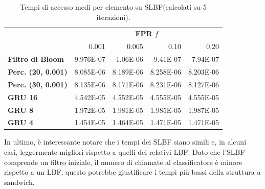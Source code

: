 \documentclass[../../main.tex]{subfiles}
\begin{document}
    \begin{table}[H]
        \centering
        \begin{tabular}{lrrrr}
            \toprule
            & \multicolumn{4}{c}{\textbf{FPR} $f$}\\
            & 0.001 & 0.005 & 0.10 & 0.20\\        
            \midrule
            \textbf{Filtro di Bloom} & 9.976E-07 & 1.06E-06 & 9.41E-07 & 7.94E-07\\
            \midrule
            \textbf{Perc. (20, 0.001)} & 8.085E-06 & 8.189E-06 &  8.258E-06 & 8.203E-06\\
            \textbf{Perc. (30, 0.001)} & 8.135E-06 & 8.171E-06 &  8.231E-06 & 8.127E-06\\
            \textbf{GRU 16} & 4.542E-05 & 4.552E-05 &  4.555E-05 & 4.555E-05\\
            \textbf{GRU 8} &  1.972E-05 & 1.981E-05 &  1.985E-05 & 1.987E-05\\
            \textbf{GRU 4} & 1.454E-05 & 1.464E-05 & 1.471E-05 & 1.471E-05\\
            \bottomrule
        \end{tabular}
        \caption{Tempi di accesso medi per elemento su SLBF(calcolati su 5 iterazioni).}
        \label{tab:tempiMediSLBF}
    \end{table}

    In ultimo, è interessante notare che i tempi dei SLBF siano simili e, in alcuni casi, leggermente migliori rispetto a quelli dei relativi LBF. Dato che l'SLBF comprende un filtro iniziale, il numero di chiamate al classificatore è minore rispetto a un LBF, questo potrebbe giustificare i tempi più bassi della struttura a sandwich.
\end{document}
